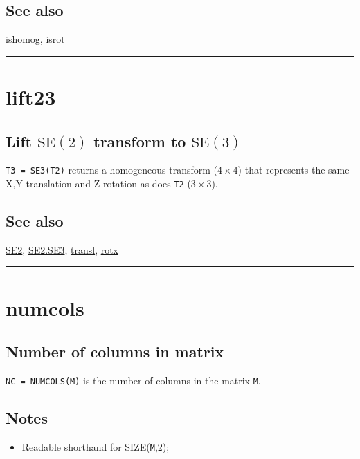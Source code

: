 \subsection*{See also}


\hyperlink{ishomog}{\color{blue} ishomog}, \hyperlink{isrot}{\color{blue} isrot}

\vspace{1.5ex}\rule{\textwidth}{1mm}

\hypertarget{lift23}{\section*{lift23}}
\subsection*{Lift $\mbox{SE}(2)$ transform to $\mbox{SE}(3)$}


\texttt{T3 = SE3(T2)} returns a homogeneous transform ($4 \times 4$) that represents
the same X,Y translation and Z rotation as does \texttt{T2} ($3 \times 3$).


\subsection*{See also}


\hyperlink{SE2}{\color{blue} SE2}, \hyperlink{SE2.SE3}{\color{blue} SE2.SE3}, \hyperlink{transl}{\color{blue} transl}, \hyperlink{rotx}{\color{blue} rotx}

\vspace{1.5ex}\rule{\textwidth}{1mm}

\hypertarget{numcols}{\section*{numcols}}
\subsection*{Number of columns in matrix}


\texttt{NC = NUMCOLS(M)} is the number of columns in the matrix \texttt{M}.


\subsection*{Notes}
\begin{itemize}
  \item Readable shorthand for SIZE(\texttt{M},2);
\end{itemize}

